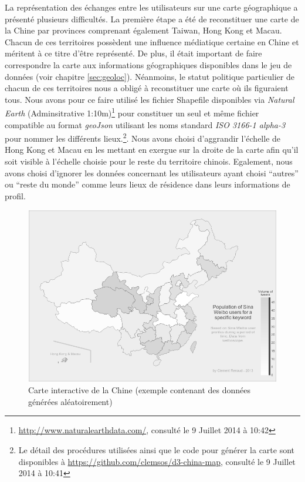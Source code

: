     La représentation des échanges entre les utilisateurs sur une carte géographique a présenté plusieurs difficultés. La première étape a été de reconstituer une carte de la Chine par provinces comprenant également Taiwan, Hong Kong et Macau. Chacun de ces territoires possèdent une influence médiatique certaine en Chine et méritent à ce titre d{\textquoteright}être représenté. De plus, il était important de faire correspondre la carte aux informations géographiques disponibles dans le jeu de données (voir chapitre \ref{sec:geoloc}). Néanmoins, le statut politique particulier de chacun de ces territoires nous a obligé à reconstituer une carte o\`u ils figuraient tous. Nous avons pour ce faire utilisé les fichier Shapefile disponibles via \textit{Natural Earth} (Adminsitrative 1:10m)\footnote{\url{http://www.naturalearthdata.com/}, consulté le 9 Juillet 2014 à 10:42} pour constituer un seul et même fichier compatible au format \textit{geoJson} utilisant les noms standard \textit{ISO 3166-1 alpha-3} pour nommer les différents lieux.\footnote{Le détail des procédures utilisées ainsi que le code pour générer la carte sont disponibles à \url{https://github.com/clemsos/d3-china-map}, consulté le 9 Juillet 2014 à 10:41}. Nous avons choisi d{\textquoteright}aggrandir l{\textquoteright}échelle de Hong Kong et Macau en les mettant en exergue sur la droite de la carte afin qu{\textquoteright}il soit visible à l'échelle choisie pour le reste du territoire chinois. Egalement, nous avons choisi d'ignorer les données concernant les utilisateurs ayant choisi {\textquotedblleft}autres{\textquotedblright} ou {\textquotedblleft}reste du monde{\textquotedblright} comme leurs lieux de résidence dans leurs informations de profil.


    \begin{figure}
        \centering
        \includegraphics[scale=0.4]{figures/chap4/ui/ui-map.png}
        \caption{Carte interactive de la Chine (exemple contenant des données générées aléatoirement)}
        \label{fig:ui-map}
    \end{figure}

